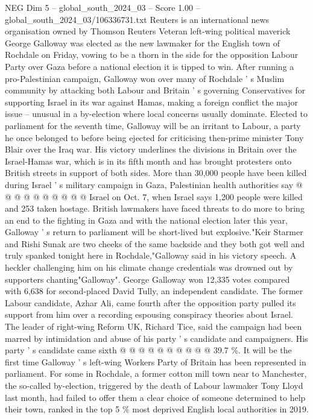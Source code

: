 \begin{textsample}{NEG Dim 5 – global\_south\_2024\_03 – Score 1.00 – global\_south\_2024\_03/106336731.txt}  \label{ex:f5_neg_315}
Reuters is an international news organisation owned by Thomson Reuters Veteran left-wing political maverick George Galloway was elected as the new lawmaker for the English town of Rochdale on Friday, vowing to be a thorn in the side for the opposition Labour Party over Gaza before a national election it is tipped to win.
After running a pro-Palestinian campaign, Galloway won over many of Rochdale ' s Muslim community by attacking both Labour and Britain ' s governing Conservatives for supporting Israel in its war against Hamas, making a foreign conflict the major issue -- unusual in a by-election where local concerns usually dominate.
Elected to parliament for the seventh time, Galloway will be an irritant to Labour, a party he once belonged to before being ejected for criticising then-prime minister Tony Blair over the Iraq war.
His victory underlines the divisions in Britain over the Israel-Hamas war, which is in its fifth month and has brought protesters onto British streets in support of both sides.
More than 30,000 people have been killed during Israel ' s military campaign in Gaza, Palestinian health authorities say @ @ @ @ @ @ @ @ @ @ Israel on Oct. 7, when Israel says 1,200 people were killed and 253 taken hostage.
British lawmakers have faced threats to do more to bring an end to the fighting in Gaza and with the national election later this year, Galloway ' s return to parliament will be short-lived but explosive."Keir Starmer and Rishi Sunak are two cheeks of the same backside and they both got well and truly spanked tonight here in Rochdale,"Galloway said in his victory speech.
A heckler challenging him on his climate change credentials was drowned out by supporters chanting"Galloway".
George Galloway won 12,335 votes compared with 6,638 for second-placed David Tully, an independent candidate.
The former Labour candidate, Azhar Ali, came fourth after the opposition party pulled its support from him over a recording espousing conspiracy theories about Israel.
The leader of right-wing Reform UK, Richard Tice, said the campaign had been marred by intimidation and abuse of his party ' s candidate and campaigners.
His party ' s candidate came sixth @ @ @ @ @ @ @ @ @ @ 39.7 \%.
It will be the first time Galloway ' s left-wing Workers Party of Britain has been represented in parliament.
For some in Rochdale, a former cotton mill town near to Manchester, the so-called by-election, triggered by the death of Labour lawmaker Tony Lloyd last month, had failed to offer them a clear choice of someone determined to help their town, ranked in the top 5 \% most deprived English local authorities in 2019.

\end{textsample}
